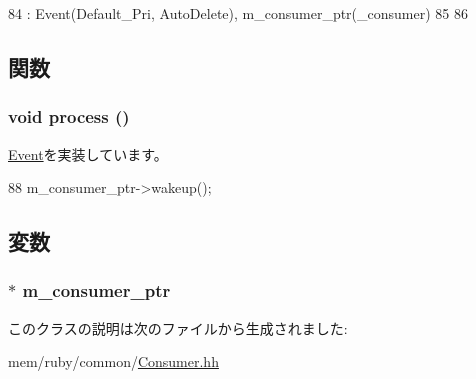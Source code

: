 \begin{DoxyCode}
84               : Event(Default_Pri, AutoDelete), m_consumer_ptr(_consumer)
85           {
86           }
\end{DoxyCode}


\subsection{関数}
\hypertarget{classConsumer_1_1ConsumerEvent_a2e9c5136d19b1a95fc427e0852deab5c}{
\subsubsection[{process}]{\setlength{\rightskip}{0pt plus 5cm}void process ()}}
\label{classConsumer_1_1ConsumerEvent_a2e9c5136d19b1a95fc427e0852deab5c}


\hyperlink{classEvent_a142b75b68a6291400e20fb0dd905b1c8}{Event}を実装しています。


\begin{DoxyCode}
88 { m_consumer_ptr->wakeup(); }
\end{DoxyCode}


\subsection{変数}
\hypertarget{classConsumer_1_1ConsumerEvent_a83dd1dc8eef330b0c0d184a4167b26b4}{
\subsubsection[{m\_\-consumer\_\-ptr}]{$\ast$ {\bf m\_\-consumer\_\-ptr}}}
\label{classConsumer_1_1ConsumerEvent_a83dd1dc8eef330b0c0d184a4167b26b4}


このクラスの説明は次のファイルから生成されました:\begin{DoxyCompactItemize}
\item 
mem/ruby/common/\hyperlink{Consumer_8hh}{Consumer.hh}\end{DoxyCompactItemize}
